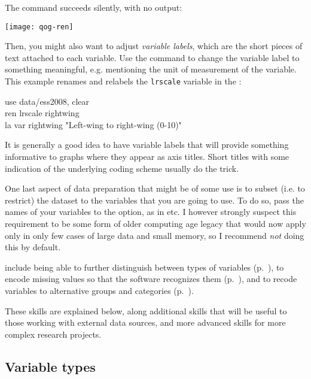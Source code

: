 The  command succeeds silently, with no output:

	\texttt{[image: qog-ren]}

%
Then, you might also want to adjust \emph{variable labels}, which are the short pieces of text attached to each variable. Use the  command to change the variable label to something meaningful, e.g. mentioning the unit of measurement of the variable. This example renames and relabels the \texttt{lrscale} variable in the \ess:

	\begin{docspec}
		use data/ess2008, clear\\
		ren lrscale rightwing\\
		la var rightwing "Left-wing to right-wing (0-10)"
	\end{docspec}

It is generally a good idea to have variable labels that will provide something informative to graphs where they appear as axis titles. Short titles with some indication of the underlying coding scheme usually do the trick.

One last aspect of data preparation that might be of some use is to subset (i.e. to restrict) the dataset to the variables that you are going to use. To do so, pass the names of your variables to the  option, as in  etc. I however strongly suspect this requirement to be some form of older computing age legacy that would now apply only in only few cases of large data and small memory, so I recommend \emph{not} doing this by default.

 include being able to further distinguish between types of variables (p.~\pageref{sec:variable-types}), to encode missing values so that the software recognizes them (p.~\pageref{sec:missing-values}), and to recode variables to alternative groups and categories (p.~\pageref{sec:categorical-recodes}).

These skills are explained below, along additional skills that will be useful to those working with external data sources, and more advanced skills for more complex research projects.%

%
%
\subsection{Variable types}
\label{sec:variable-types}

